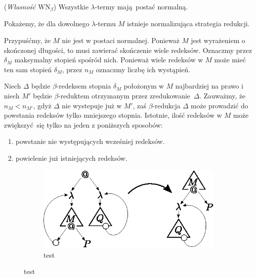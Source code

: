 \begin{twierdzenie}(\emph{Własność \(\mathrm{WN}_{\beta}\)}) Wszystkie \(\lambda\)-termy mają postać normalną.
\end{twierdzenie}
\begin{dowod}
  Pokażemy, że dla dowolnego \(\lambda\)-termu \(M\) istnieje normalizująca strategia redukcji. 

  Przypuśćmy, że \(M\) nie jest w postaci normalnej. Ponieważ \(M\) jest wyrażeniem o skończonej długości, to musi zawierać skończenie wiele redeksów. Oznaczmy przez \(\delta_M\) maksymalny stopień spośród nich. Ponieważ wiele redeksów w \(M\) może mieć ten sam stopień \(\delta_M\), przez \(n_M\) oznaczmy liczbę ich wystąpień. 

  Niech \(\Delta\) będzie \(\beta\)-redeksem stopnia \(\delta_M\) położonym w \(M\) najbardziej na prawo i niech \(M'\) będzie \(\beta\)-reduktem otrzymanym przez zredukowanie \(\Delta\). Zauważmy, że \(n_M < n_{M'}\), gdyż \(\Delta\) nie wystepuje już w \(M'\), zaś \(\beta\)-redukcja \(\Delta\) może prowadzić do powstania redeksów tylko mniejszego stopnia. Istotnie, ilość redeksów w \(M\) może zwiększyć się tylko na jeden z poniższych sposobów: 
  \begin{enumerate}[label=\roman*)]
    \item powstanie nie występujących wcześniej redeksów.
    \item powielenie już istniejących redeksów.
  \end{enumerate}

  \begin{figure}[htb]
  \centering
  \begin{subfigure}{0.55\textwidth}
    \includegraphics[width=1\linewidth]{../reduction1}
    \caption{test}
  \end{subfigure}


\end{figure}
\end{dowod}
